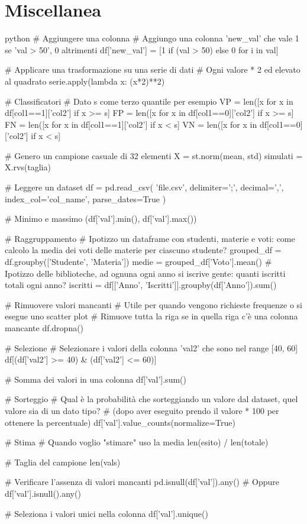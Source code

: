 \documentclass[11pt]{report}
\begin{document}
\section{Miscellanea}
\begin{mintedbox}{python}
# Aggiungere una colonna
# Aggiungo una colonna 'new_val' che vale 1 se 'val > 50', 0 altrimenti
df['new_val'] = [1 if (val > 50) else 0 for i in val]

# Applicare una trasformazione su una serie di dati
# Ogni valore * 2 ed elevato al quadrato
serie.apply(lambda x: (x*2)**2)

# Classificatori
# Dato s come terzo quantile per esempio
VP = len([x for x in df[col1==1]['col2'] if x >= s]
FP = len([x for x in df[col1==0]['col2'] if x >= s]
FN = len([x for x in df[col1==1]['col2'] if x < s]
VN = len([x for x in df[col1==0]['col2'] if x < s]

# Genero un campione casuale di 32 elementi
X = st.norm(mean, std)
simulati = X.rvs(taglia)

# Leggere un dataset
df = pd.read_csv(
    'file.csv',
    delimiter=';',
    decimal=',',
    index_col='col_name',
    parse_dates=True
)

# Minimo e massimo
(df['val'].min(), df['val'].max())

# Raggruppamento
# Ipotizzo un dataframe con studenti, materie e voti: come calcolo la media dei voti delle materie per ciascuno studente?
grouped_df = df.groupby(['Studente', 'Materia'])
medie = grouped_df['Voto'].mean()
# Ipotizzo delle biblioteche, ad ognuna ogni anno si iscrive gente: quanti iscritti totali ogni anno?
iscritti = df[['Anno', 'Iscritti']].groupby(df['Anno']).sum()

# Rimuovere valori mancanti
# Utile per quando vengono richieste frequenze o si esegue uno scatter plot
# Rimuove tutta la riga se in quella riga c'è una colonna mancante
df.dropna()

# Selezione
# Selezionare i valori della colonna 'val2' che sono nel range [40, 60]
df[(df['val2'] >= 40) & (df['val2'] <= 60)]

# Somma dei valori in una colonna
df['val'].sum()

# Sorteggio
# Qual è la probabilità che sorteggiando un valore dal dataset, quel valore sia di un dato tipo?
# (dopo aver eseguito prendo il valore * 100 per ottenere la percentuale)
df['val'].value_counts(normalize=True)

# Stima
# Quando voglio "stimare" uso la media
len(esito) / len(totale)

# Taglia del campione
len(vals)

# Verificare l'assenza di valori mancanti
pd.isnull(df['val']).any()
# Oppure
df['val'].isnull().any()

# Seleziona i valori unici nella colonna
df['val'].unique()
\end{mintedbox}
\end{document}

